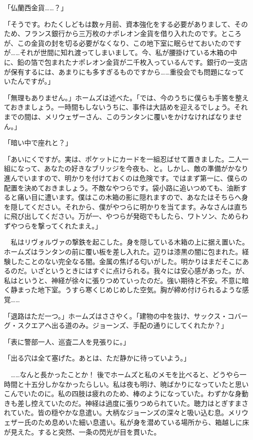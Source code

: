 \documentclass[tate,paper=b6j,jafontsize=9pt]{jlreq}
\begin{document}
「仏蘭西金貨……？」

「そうです。わたくしどもは数ヶ月前、資本強化をする必要がありまして、そのため、フランス銀行から三万枚のナポレオン金貨を借り入れたのです。ところが、この金貨の封を切る必要がなくなり、この地下室に眠らせておいたのですが……それが世間に知れ渡ってしまいまして。今、私が腰掛けている木箱の中に、鉛の箔で包まれたナポレオン金貨が二千枚入っているんです。銀行の一支店が保有するには、あまりにも多すぎるものですから……重役会でも問題になっていたんですが。」

「無理もありません。」ホームズは述べた。「では、今のうちに僕らも手筈を整えておきましょう。一時間もしないうちに、事件は大詰めを迎えるでしょう。それまでの間は、メリウェザーさん、このランタンに覆いをかけなければなりません。」

「暗い中で座れと？」

「あいにくですが。実は、ポケットにカードを一組忍ばせて置きました。二人一組になって、あなたの好きなブリッジを今夜も、と。しかし、敵の準備がかなり進んでいますので、明かりを付けておくのは危険です。ではまず第一に、僕らの配置を決めておきましょう。不敵なやつらです。袋小路に追いつめても、油断すると痛い目に遭います。僕はこの木箱の影に隠れますので、あなたはそちらへ身を隠してください。それから、僕がやつらに明かりを当てます。みなさんは直ちに飛び出してください。万が一、やつらが発砲でもしたら、ワトソン、ためらわずやつらを撃ってくれたまえ。」

　私はリヴォルヴァの撃鉄を起こした。身を隠している木箱の上に据え置いた。ホームズはランタンの前に覆い板を差し入れた。辺りは漆黒の闇に包まれた。経験したことのない完全なる闇。金属の焦げる匂いがした。明かりはまだそこにあるのだ。いざというときにはすぐに点けられる。我々には安心感があった。が、私はというと、神経が徐々に張りつめていったのだ。強い期待と不安。不意に暗く静まった地下室。うすら寒くじめじめした空気。胸が締め付けられるような感覚……

「退路はただ一つ。」ホームズはささやく。「建物の中を抜け、サックス・コバーグ・スクエアへ出る道のみ。ジョーンズ、手配の通りにしてくれたか？」

「表に警部一人、巡査二人を見張りに。」

「出る穴は全て塞げた。あとは、ただ静かに待っていよう。」

　……なんと長かったことか！ 後でホームズと私のメモを比べると、どうやら一時間と十五分しかなかったらしい。私は夜も明け、暁ばかりになっていたと思いこんでいたのに。私の四肢は疲れのため、棒のようになっていた。わずかな身動きも差し控えていたのだ。神経は過度に張りつめられていた。聴力はとぎすまされていた。皆の穏やかな息遣い。大柄なジョーンズの深々と吸い込む息。メリウェザー氏のため息めいた細い息遣い。私が身を潜めている場所から、箱越しに床が見えた。すると突然、一条の閃光が目を貫いた。
\end{document}
